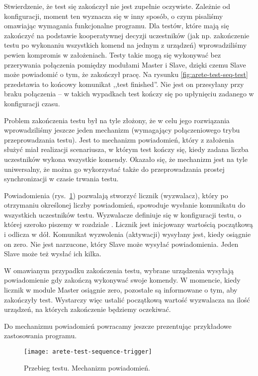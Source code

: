 \documentclass[00-praca-magisterska.tex]{subfiles}
\begin{document}
Stwierdzenie, że test się zakończył nie jest zupełnie oczywiste. Zależnie od
konfiguracji, moment ten wyznacza się w inny sposób, o czym pisaliśmy omawiając
wymagania funkcjonalne programu. Dla testów, które mają się zakończyć na
podstawie kooperatywnej decyzji uczestników (jak np. zakończenie testu po
wykonaniu wszystkich komend na jednym z urządzeń) wprowadziliśmy pewien
kompromis w założeniach. Testy takie mogą się wykonywać bez przerywania
połączenia pomiędzy modułami Master i Slave, dzięki czemu Slave może powiadomić
o tym, że zakończył pracę. Na rysunku \ref{fig:arete-test-seq-test} przedstawia
to końcowy komunikat ,,test finished''. Nie jest on przesyłany przy braku
połączenia -- w takich wypadkach test kończy się po upłynięciu zadanego w
konfiguracji czasu.

Problem zakończenia testu był na tyle złożony, że w celu jego rozwiązania
wprowadziliśmy jeszcze jeden mechanizm (wymagający połączeniowego trybu
przeprowadzania testu). Jest to mechanizm powiadomień, który z założenia służyć
miał realizacji scenariusza, w którym test kończy się, kiedy zadana liczba
uczestników wykona wszystkie komendy. Okazało się, że mechanizm jest na tyle
uniwersalny, że można go wykorzystać także do przeprowadzania prostej
synchronizacji w czasie trwania testu.

Powiadomienia (rys.~\ref{fig:arete-test-seq-trigger}) pozwalają stworzyć
licznik (wyzwalacz), który po otrzymaniu określonej liczby powiadomień,
spowoduje wysłanie komunikatu do wszystkich uczestników testu. Wyzwalacze
definiuje się w konfiguracji testu, o której szeroko piszemy w rozdziale
. Licznik jest inicjowany wartością początkową i odlicza w
dół. Komunikat wyzwolenia (aktywacji) wysyłany jest, kiedy osiągnie on zero.
Nie jest narzucone, który Slave może wysyłać powiadomienia. Jeden Slave może
też wysłać ich kilka.

W omawianym przypadku zakończenia testu, wybrane urządzenia wysyłają
powiadomienie gdy zakończą wykonywać swoje komendy. W momencie, kiedy licznik w
module Master osiągnie zero, pozostałe są informowane o tym, aby zakończyły
test. Wystarczy więc ustalić początkową wartość wyzwalacza na ilość urządzeń,
na których zakończenie będziemy oczekiwać.

Do mechanizmu powiadomień powracamy jeszcze prezentując przykładowe
zastosowania programu.

\begin{figure}
\begin{center}
\leavevmode
\texttt{[image: arete-test-sequence-trigger]}
\end{center}
\caption{Przebieg testu. Mechanizm powiadomień.}
\label{fig:arete-test-seq-trigger}
\end{figure}
\end{document}
